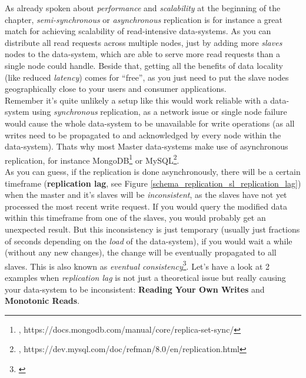 {As already spoken about \textit{performance} and \textit{scalability} at the beginning of the chapter, \textit{semi-synchronous} or \textit{asynchronous} replication is for instance a great match for achieving scalability of read-intensive data-systems. As you can distribute all read requests across multiple nodes, just by adding more \textit{slaves} nodes to the data-system, which are able to serve more read requests than a single node could handle. Beside that, getting all the benefits of data locality (like reduced \textit{latency}) comes for ``free'', as you just need to put the slave nodes geographically close to your users and consumer applications. \\
Remember it's quite unlikely a setup like this would work reliable with a data-system using \textit{synchronous} replication, as a network issue or single node failure would cause the whole data-system to be unavailable for write operations (as all writes need to be propagated to and acknowledged by every node within the data-system). Thats why most Master data-systems make use of asynchronous replication, for instance MongoDB\footnote{\cite{MDBASYNC}, https://docs.mongodb.com/manual/core/replica-set-sync/} or MySQL\footnote{\cite{MYSQLASYNC}, https://dev.mysql.com/doc/refman/8.0/en/replication.html}.\\

As you can guess, if the replication is done asynchronously, there will be a certain timeframe (\textbf{replication lag}, see Figure \ref{schema_replication_sl_replication_lag}) when the master and it's slaves will be \textit{inconsistent}, as the slaves have not yet processed the most recent write request. If you would query the modified data within this timeframe from one of the slaves, you would probably get an unexpected result. But this inconsistency is just temporary (usually just fractions of seconds depending on the \textit{load} of the data-system), if you would wait a while (without any new changes), the change will be eventually propagated to all slaves. This is also known as \textit{eventual consistency}\footnote{\cite{DBEC}}. Let's have a look at 2 examples when \textit{replication lag} is not just a theoretical issue but really causing your data-system to be inconsistent: \textbf{Reading Your Own Writes} and \textbf{Monotonic Reads}.\\

}
